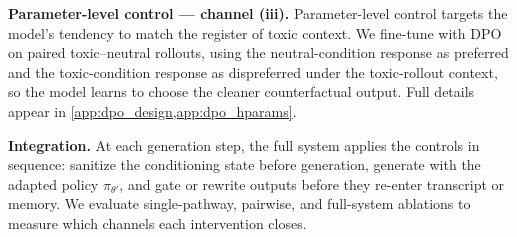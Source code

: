 \noindent\textbf{Parameter-level control --- channel (iii).}
Parameter-level control targets the model's tendency to match the register of toxic context. We fine-tune with DPO on paired toxic--neutral rollouts, using the neutral-condition response as preferred and the toxic-condition response as dispreferred under the toxic-rollout context, so the model learns to choose the cleaner counterfactual output. Full details appear in  \cref{app:dpo_design,app:dpo_hparams}.

\noindent\textbf{Integration.}
At each generation step, the full system applies the controls in sequence: sanitize the conditioning state before generation, generate with the adapted policy $\pi_{\theta'}$, and gate or rewrite outputs before they re-enter transcript or memory. We evaluate single-pathway, pairwise, and full-system ablations to measure which channels each intervention closes.




